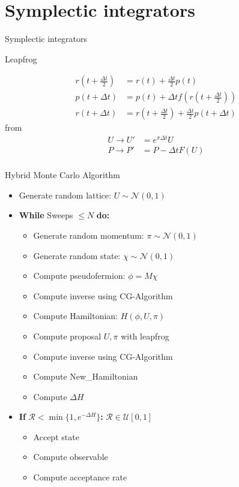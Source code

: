 \documentclass[10pt]{beamer}
\begin{document}
\section{Symplectic integrators}
\begin{frame}{Symplectic integrators}
    \begin{center} Leapfrog \end{center}
    \begin{align}
        r(t+\frac{\Delta t}{2}) &= r(t) + \frac{\Delta t}{2} p(t) \\
        p(t+\Delta t) &= p(t) +\Delta t f\left(r(t+\frac{\Delta t}{2})\right) \\
        r(t+\Delta t) &= r(t+\frac{\Delta t}{2}) + \frac{\Delta t}{2}p(t+\Delta t)
    \end{align}
    from~\cite{luscher2010computational}
    \begin{align}
        U \to U' &= e^{\pi \Delta t} U\\
        P \to P' &= P  - \Delta t F(U)\\
    \end{align}
    
\end{frame}


\begin{frame}{Hybrid Monte Carlo Algorithm}
    \begin{itemize}
       \item Generate random lattice: $U \sim \mathcal{N}(0,1)  $
       \item \textbf{While} Sweeps $\leq  N $ \textbf{do:}
        \begin{itemize}
            \item Generate random momentum: $\pi \sim \mathcal{N}(0,1) $
            \item Generate random state: $\chi \sim \mathcal{N}(0,1) $
            \item Compute pseudofermion: $\phi = M \chi $
            \item Compute inverse using CG-Algorithm
            \item Compute Hamiltonian: $H(\phi,U,\pi)$
            \item Compute proposal $U,\pi$ with leapfrog
            \item Compute inverse using CG-Algorithm
            \item Compute New\_Hamiltonian
            \item Compute $\Delta H$
       \end{itemize}
       \item \textbf{If} $\mathcal{R} < \min\{1,e^{- \Delta H}\}$\textbf{:}  \hspace{3cm}       $\mathcal{R} \in \mathcal{U}[0,1]$
        \begin{itemize}
            \item Accept state 
            \item Compute observable
            \item Compute acceptance rate
        \end{itemize}
    \end{itemize}
\end{frame}
        
\end{document}
